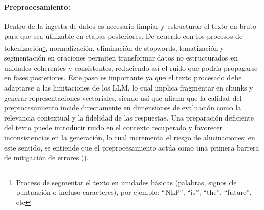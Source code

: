 \paragraph{Preprocesamiento:} Dentro de la ingesta de datos es necesario limpiar y estructurar el texto en bruto para que sea utilizable en etapas posteriores. De acuerdo con \textcite{tabassum2020} los procesos de tokenización\footnote{Proceso de segmentar el texto en unidades básicas (palabras, signos de puntuación o incluso caracteres), por ejemplo: “NLP”, “is”, “the”, “future”, etc},
normalización, eliminación de stopwords, lematización y segmentación en oraciones permiten transformar datos no estructurados en unidades coherentes y consistentes, reduciendo así el ruido que podría propagarse en fases posteriores. 
Este paso es importante ya que el texto procesado debe adaptarse a las limitaciones de los LLM, lo cual implica fragmentar en chunks y generar representaciones vectoriales, siendo así que \textcite{knollmeyer2024benchmarking} 
afirma que la calidad del preprocesamiento incide directamente en dimensiones de evaluación como la relevancia contextual y la fidelidad de las respuestas. Una preparación deficiente del texto puede introducir ruido en el contexto recuperado 
y favorecer inconsistencias en la generación, lo cual incrementa el riesgo de alucinaciones; en este sentido, se entiende que el preprocesamiento actúa como una primera barrera de mitigación de errores (\textcite{zhang2025hallucination}).

